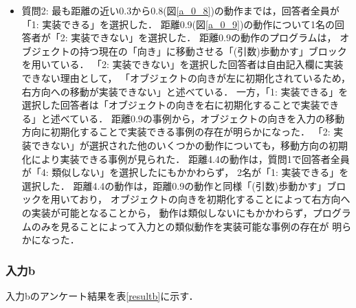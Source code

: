 \documentclass[11pt]{jreport}
\begin{document}
\begin{itemize}
    \item 質問2: 最も距離の近い0.3から0.8(図\ref{a_0_8})の動作までは，回答者全員が「1: 実装できる」を選択した．
    距離0.9(図\ref{a_0_9})の動作について1名の回答者が「2: 実装できない」を選択した．
    距離0.9の動作のプログラムは，
    オブジェクトの持つ現在の「向き」に移動させる「(引数)歩動かす」ブロックを用いている．
    「2: 実装できない」を選択した回答者は自由記入欄に実装できない理由として，
    「オブジェクトの向きが左に初期化されているため，右方向への移動が実装できない」と述べている．
    一方，「1: 実装できる」を選択した回答者は「オブジェクトの向きを右に初期化することで実装できる」と述べている．
    距離0.9の事例から，オブジェクトの向きを入力の移動方向に初期化することで実装できる事例の存在が明らかになった．
    「2: 実装できない」が選択された他のいくつかの動作についても，移動方向の初期化により実装できる事例が見られた．
    距離4.4の動作は，質問1で回答者全員が「4: 類似しない」を選択したにもかかわらず，
    2名が「1: 実装できる」を選択した．
    距離4.4の動作は，距離0.9の動作と同様「(引数)歩動かす」ブロックを用いており，
    オブジェクトの向きを初期化することによって右方向への実装が可能となることから，
    動作は類似しないにもかかわらず，プログラムのみを見ることによって入力との類似動作を実装可能な事例の存在が
    明らかになった．
\end{itemize}

\subsubsection{入力b}
入力bのアンケート結果を表\ref{resultb}に示す．
\end{document}
